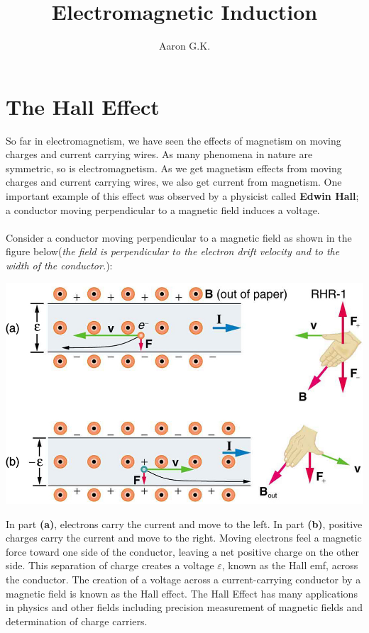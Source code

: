 \documentclass[11pt]{article}
\title{Electromagnetic Induction}
\author{Aaron G.K.}
\begin{document}
	\maketitle
	\section*{The Hall Effect}
	So far in electromagnetism, we have seen the effects of magnetism on moving charges and current carrying wires. As many phenomena in nature are symmetric, so is electromagnetism. As we get magnetism effects from moving charges and current carrying wires, we also get current from magnetism. One important example of this effect was observed by a physicist called \textbf{Edwin Hall}; a conductor moving perpendicular to a magnetic field induces a voltage.\\ \\
	Consider a conductor moving perpendicular to a magnetic field as shown in the figure below(\textit{the field is perpendicular to the electron drift velocity and to the width of the conductor.}):
	\begin{center}
		\includegraphics[scale=0.5]{hall_1}
	\end{center}
	In part \textbf{(a)}, electrons carry the current and move to the left. In part \textbf{(b)}, positive charges carry the current and move to the right. Moving electrons feel a magnetic force toward one side of the conductor, leaving a net positive charge on the other side. This separation of charge creates a voltage $\varepsilon$, known as the Hall emf, across the conductor. The creation of a voltage across a current-carrying conductor by a magnetic field is known as the Hall effect. The Hall Effect has many applications in physics and other fields including precision measurement of magnetic fields and determination of charge carriers. \\ \\
\end{document}
